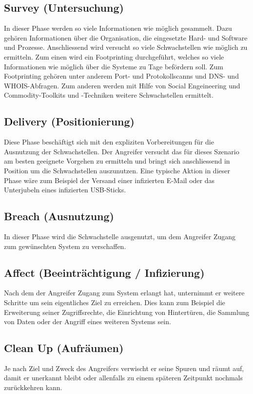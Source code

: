 \subsection{Survey (Untersuchung)}
In dieser Phase werden so viele Informationen wie möglich gesammelt. Dazu gehören Informationen über die Organisation, die eingesetzte Hard- und Software und Prozesse. Anschliessend wird versucht so viele Schwachstellen wie möglich zu ermitteln. Zum einen wird ein Footprinting durchgeführt, welches so viele Informationen wie möglich über die Systeme zu Tage befördern soll. Zum Footprinting gehören unter anderem Port- und Protokollscanns und DNS- und WHOIS-Abfragen. Zum anderen werden mit Hilfe von Social Engeineering und Commodity-Toolkits und -Techniken weitere Schwachstellen ermittelt.


\subsection{Delivery (Positionierung)}
Diese Phase beschäftigt sich mit den expliziten Vorbereitungen für die Ausnutzung der Schwachstellen. Der Angreifer versucht das für dieses Szenario am besten geeignete Vorgehen zu ermitteln und bringt sich anschliessend in Position um die Schwachstellen auszunutzen. Eine typische Aktion in dieser Phase wäre zum Beispiel der Versand einer infizierten E-Mail oder das Unterjubeln eines infizierten USB-Sticks.


\subsection{Breach (Ausnutzung)}
In dieser Phase wird die Schwachstelle ausgenutzt, um dem Angreifer Zugang zum gewünschten System zu verschaffen.

\subsection{Affect (Beeinträchtigung / Infizierung)}
Nach dem der Angreifer Zugang zum System erlangt hat, unternimmt er weitere Schritte um sein eigentliches Ziel zu erreichen. Dies kann zum Beispiel die Erweiterung seiner Zugriffsrechte, die Einrichtung von Hintertüren, die Sammlung von Daten oder der Angriff eines weiteren Systems sein.


\subsection{Clean Up (Aufräumen)}
Je nach Ziel und Zweck des Angreifers verwischt er seine Spuren und räumt auf, damit er unerkannt bleibt oder allenfalls zu einem späteren Zeitpunkt nochmals zurückkehren kann.
